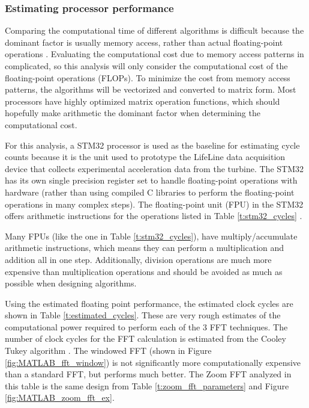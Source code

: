 \subsubsection{Estimating processor performance}
Comparing the computational time of different algorithms is difficult because the dominant factor is usually memory access, rather than actual floating-point operations \cite{nussbaumer2012fast}.  Evaluating the computational cost due to memory access patterns in complicated, so this analysis will only consider the computational cost of the floating-point operations (FLOPs).  To minimize the cost from memory access patterns, the algorithms will be vectorized and converted to matrix form.  Most processors have highly optimized matrix operation functions, which should hopefully make arithmetic the dominant factor when determining the computational cost.

For this analysis, a STM32 processor is used as the baseline for estimating cycle counts because it is the unit used to prototype the LifeLine data acquisition device that collects experimental acceleration data from the turbine.  The STM32 has its own single precision register set to handle floating-point operations with hardware (rather than using compiled C libraries to perform the floating-point operations in many complex steps).  The floating-point unit (FPU) in the STM32 offers arithmetic instructions for the operations listed in Table \ref{t:stm32_cycles} \cite{stm32_floating_point}.

Many FPUs (like the one in Table \ref{t:stm32_cycles}), have multiply/accumulate arithmetic instructions, which means they can perform a multiplication and addition all in one step.  Additionally, division operations are much more expensive than multiplication operations and should be avoided as much as possible when designing algorithms.

Using the estimated floating point performance, the estimated clock cycles are shown in Table \ref{t:estimated_cycles}.  These are very rough estimates of the computational power required to perform each of the 3 FFT techniques.  The number of clock cycles for the FFT calculation is estimated from the Cooley Tukey algorithm \cite{puschel2007algebraic}.   The windowed FFT (shown in Figure \ref{fig:MATLAB_fft_window}) is not significantly more computationally expensive than a standard FFT, but performs much better.  The Zoom FFT analyzed in this table is the same design from Table \ref{t:zoom_fft_parameters} and Figure \ref{fig:MATLAB_zoom_fft_ex}.

